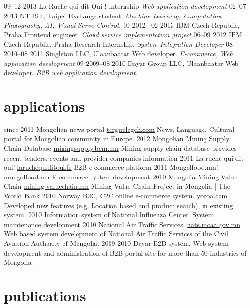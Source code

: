 \documentclass[backend=biber, print]{friggeri-cv}
\begin{document}
\begin{entrylist}
  \entry
    {09–12 2013}
    {La Ruche qui dit Oui !}
    {Internship}
    {\emph{Web application development}}
  \entry
    {02–07 2013}
    {NTUST, Taipei}
    {Exchange student.}
    {\emph{Machine Learning, Computation Photography, AI, Visual Servo Control.}}
  \entry
    {10 2012 –02 2013}
    {IBM Czech Republic, Praha}
    {Frontend engineer.}
    {\emph{Cloud service implementation project}}
  \entry
    {06–09 2012}
    {IBM Czech Republic, Praha}
    {Research Internship.}
    {\emph{System Integration Developer}}
  \entry
    {08 2010–08 2011}
    {Singleton LLC, Ulaanbaatar}
    {Web developer.}
    {\emph{E-commerce, Web application development}}
  \entry
    {09 2009–08 2010}
    {Dayar Group LLC, Ulaanbaatar}
    {Web developer.}
    {\emph{B2B web application development.}}
\end{entrylist}

\section{applications}

\begin{entrylist}
  \entry
    {since 2011}
    {Mongolian news portal}
    {\href{http://terguulegch.com}{terguulegch.com}}
    {News, Language, Cultural portal for Mongolian community in Europe.}
  \entry
    {2012}
    {Mongolian Mining Supply Chain Database}
    {\href{http://miningsupply.bcm.mn}{miningsupply.bcm.mn}}
    {Mining supply chain database provides recent tenders, events and provider companies information }
  \entry
    {2011}
    {La ruche qui dit oui!}
    {\href{http://www.laruchequiditoui.fr}{laruchequiditoui.fr}}
    {B2B e-commerce platform}
  \entry
    {2011}
    {Mongolfood.mn!}
    {\href{http://mongolfood.mn/}{mongolfood.mn}}
    {E-commerce system development}
  \entry
    {2010}
    {Mongolia Mining Value Chain}
    {\href{http://mining-valuechain.eri.mn}{mining-valuechain.mn}}
    {Mining Value Chain Project in Mongolia | The World Bank}
  \entry
    {2010}
    {Norway B2C, C2C online e-commerce system.}
    {\href{http://dev.yozoa.com}{yozoa.com}}
    {Developed new features (e.g. Location based and product search),  in existing system.}
  \entry
    {2010}
    {Information system of National Influenza Center.}
    {}
    {System maintenance development}
  \entry
    {2010}
    {National Air Traffic Services.}
    {\href{http://nats.mcaa.gov.mn/}{nats.mcaa.gov.mn}}
    {Web based system development of National Air Traffic Services of the Civil Aviation Authority of Mongolia.}
  \entry
    {2009-2010}
    {Dayar B2B system.}
    {}
    {Web system development and administration of B2B portal site for more than 50 industries of Mongolia.}
\end{entrylist}

\section{publications}

\begin{refsection}
  \nocite{*}
    \printbibliography[sorting=chronological, type=inproceedings, title={international peer-reviewed conferences/proceedings}, notkeyword={france}, heading=subbibliography]
    \end{refsection}
\end{document}
